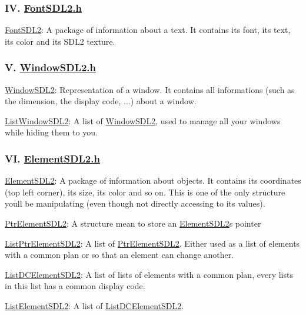 \subsubsection*{IV. \hyperlink{FontSDL2_8h}{Font\+S\+D\+L2.\+h}}


\begin{DoxyEnumerate}
\item \hyperlink{structFontSDL2}{Font\+S\+D\+L2}\+: A package of information about a text. It contains its font, its text, its color and its S\+D\+L2 texture.
\end{DoxyEnumerate}

\subsubsection*{V. \hyperlink{WindowSDL2_8h}{Window\+S\+D\+L2.\+h}}


\begin{DoxyEnumerate}
\item \hyperlink{structWindowSDL2}{Window\+S\+D\+L2}\+: Representation of a window. It contains all informations (such as the dimension, the display code, ...) about a window.
\item \hyperlink{structListWindowSDL2}{List\+Window\+S\+D\+L2}\+: A list of \hyperlink{structWindowSDL2}{Window\+S\+D\+L2}, used to manage all your windows while hiding them to you.
\end{DoxyEnumerate}

\subsubsection*{VI. \hyperlink{ElementSDL2_8h}{Element\+S\+D\+L2.\+h}}


\begin{DoxyEnumerate}
\item \hyperlink{structElementSDL2}{Element\+S\+D\+L2}\+: A package of information about objects. It contains its coordinates (top left corner), its size, its color and so on. This is one of the only structure you\textquotesingle{}ll be manipulating (even though not directly accessing to its values).
\item \hyperlink{structPtrElementSDL2}{Ptr\+Element\+S\+D\+L2}\+: A structure mean to store an \hyperlink{structElementSDL2}{Element\+S\+D\+L2}\textquotesingle{}s pointer
\item \hyperlink{structListPtrElementSDL2}{List\+Ptr\+Element\+S\+D\+L2}\+: A list of \hyperlink{structPtrElementSDL2}{Ptr\+Element\+S\+D\+L2}. Either used as a list of elements with a common plan or so that an element can change another.
\item \hyperlink{structListDCElementSDL2}{List\+D\+C\+Element\+S\+D\+L2}\+: A list of lists of elements with a common plan, every lists in this list has a common display code.
\item \hyperlink{structListElementSDL2}{List\+Element\+S\+D\+L2}\+: A list of \hyperlink{structListDCElementSDL2}{List\+D\+C\+Element\+S\+D\+L2}.
\end{DoxyEnumerate}


